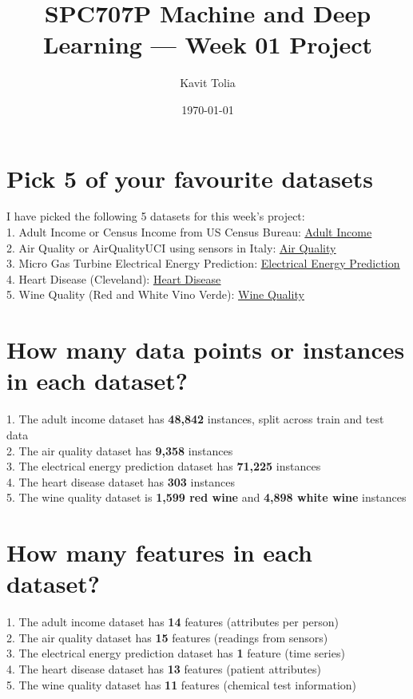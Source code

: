 \documentclass[11pt]{article}
\title{SPC707P Machine and Deep Learning — Week 01 Project}
\author{Kavit Tolia}
\date{\today}
\begin{document}
\maketitle

\section{Pick 5 of your favourite datasets}
I have picked the following 5 datasets for this week's project: \\
1. Adult Income or Census Income from US Census Bureau: \href{https://archive.ics.uci.edu/dataset/2/adult}{\underline{Adult Income}} \\
2. Air Quality or AirQualityUCI using sensors in Italy: \href{https://archive.ics.uci.edu/dataset/360/air+quality}{\underline{Air Quality}} \\
3. Micro Gas Turbine Electrical Energy Prediction: \href{https://archive.ics.uci.edu/dataset/994/micro+gas+turbine+electrical+energy+prediction}{\underline{Electrical Energy Prediction}} \\
4. Heart Disease (Cleveland): \href{https://archive.ics.uci.edu/dataset/45/heart+disease}{\underline{Heart Disease}} \\
5. Wine Quality (Red and White Vino Verde): \href{https://archive.ics.uci.edu/dataset/186/wine+quality}{\underline{Wine Quality}} 

\section{How many data points or instances in each dataset?}
1. The adult income dataset has \textbf{48,842} instances, split across train and test data \\
2. The air quality dataset has \textbf{9,358} instances \\
3. The electrical energy prediction dataset has \textbf{71,225} instances \\
4. The heart disease dataset has \textbf{303} instances \\
5. The wine quality dataset is \textbf{1,599 red wine} and \textbf{4,898 white wine} instances

\section{How many features in each dataset?}
1. The adult income dataset has \textbf{14} features (attributes per person) \\
2. The air quality dataset has \textbf{15} features (readings from sensors) \\
3. The electrical energy prediction dataset has \textbf{1} feature (time series) \\
4. The heart disease dataset has \textbf{13} features (patient attributes) \\
5. The wine quality dataset has \textbf{11} features (chemical test information)
\end{document}
